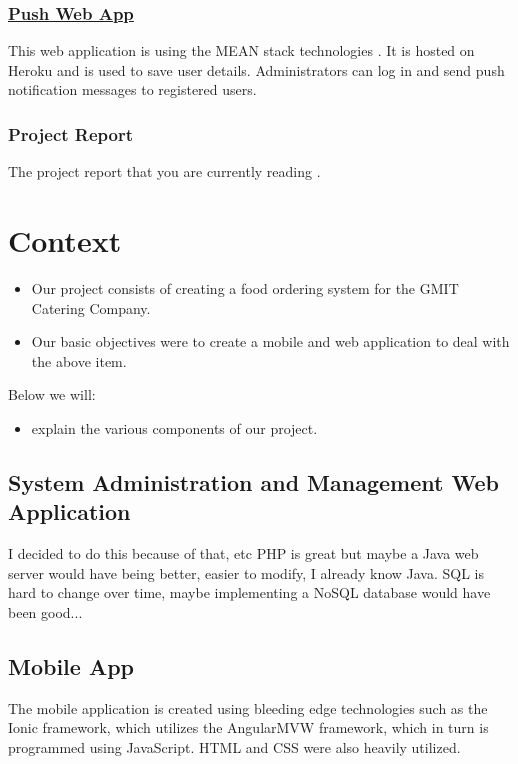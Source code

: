 \subsection*{\href{https://github.com/RonanC/gmitcat-push}{Push Web App}}
This web application is using the MEAN stack technologies \cite{gh_push_webapp}.
It is hosted on Heroku and is used to save user details.
Administrators can log in and send push notification messages to registered users.

\subsection*{Project Report}
The project report that you are currently reading \cite{gh_project_report}.

\chapter{Context}	%

\begin{itemize}
\item Our project consists of creating a food ordering system for the GMIT Catering Company.
\item Our basic objectives were to create a mobile and web application to deal with the above item.
\end{itemize}

Below we will:
\begin{itemize}
\item explain the various components of our project.
\end{itemize}

\section{System Administration and Management Web Application}
I decided to do this because of that, etc
PHP is great but maybe a Java web server would have being better, easier to modify, I already know Java.
SQL is hard to change over time, maybe implementing a NoSQL database would have been good...

\section{Mobile App}
The mobile application is created using bleeding edge technologies such as the Ionic framework, which utilizes the AngularMVW framework, which in turn is programmed using JavaScript. HTML and CSS were also heavily utilized.
\\

